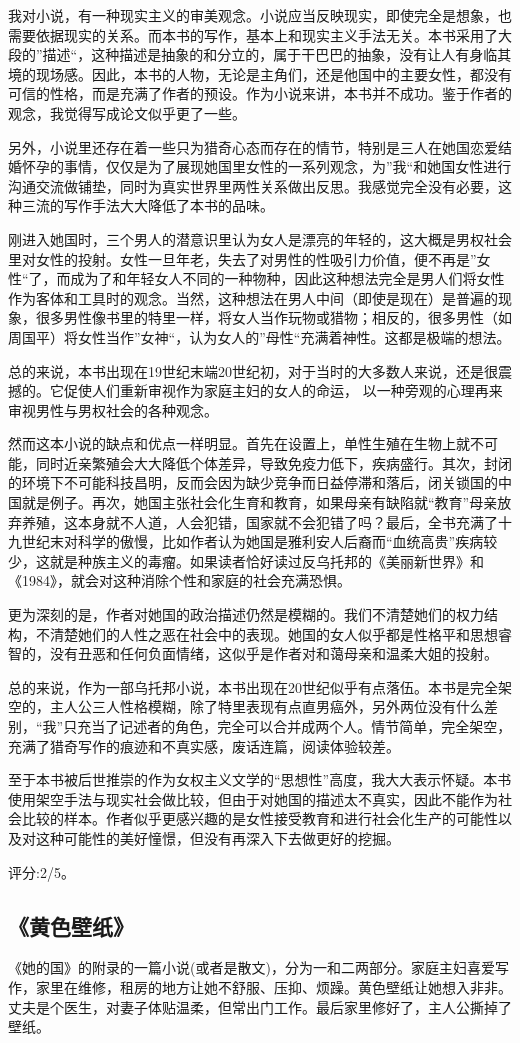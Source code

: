 我对小说，有一种现实主义的审美观念。小说应当反映现实，即使完全是想象，也需要依据现实的关系。而本书的写作，基本上和现实主义手法无关。本书采用了大段的”描述“，这种描述是抽象的和分立的，属于干巴巴的抽象，没有让人有身临其境的现场感。因此，本书的人物，无论是主角们，还是他国中的主要女性，都没有可信的性格，而是充满了作者的预设。作为小说来讲，本书并不成功。鉴于作者的观念，我觉得写成论文似乎更了一些。

另外，小说里还存在着一些只为猎奇心态而存在的情节，特别是三人在她国恋爱结婚怀孕的事情，仅仅是为了展现她国里女性的一系列观念，为”我“和她国女性进行沟通交流做铺垫，同时为真实世界里两性关系做出反思。我感觉完全没有必要，这种三流的写作手法大大降低了本书的品味。

刚进入她国时，三个男人的潜意识里认为女人是漂亮的年轻的，这大概是男权社会里对女性的投射。女性一旦年老，失去了对男性的性吸引力价值，便不再是”女性“了，而成为了和年轻女人不同的一种物种，因此这种想法完全是男人们将女性作为客体和工具时的观念。当然，这种想法在男人中间（即使是现在）是普遍的现象，很多男性像书里的特里一样，将女人当作玩物或猎物；相反的，很多男性（如周国平）将女性当作”女神“，认为女人的”母性“充满着神性。这都是极端的想法。

总的来说，本书出现在19世纪末端20世纪初，对于当时的大多数人来说，还是很震撼的。它促使人们重新审视作为家庭主妇的女人的命运， 以一种旁观的心理再来审视男性与男权社会的各种观念。

然而这本小说的缺点和优点一样明显。首先在设置上，单性生殖在生物上就不可能，同时近亲繁殖会大大降低个体差异，导致免疫力低下，疾病盛行。其次，封闭的环境下不可能科技昌明，反而会因为缺少竞争而日益停滞和落后，闭关锁国的中国就是例子。再次，她国主张社会化生育和教育，如果母亲有缺陷就“教育”母亲放弃养殖，这本身就不人道，人会犯错，国家就不会犯错了吗？最后，全书充满了十九世纪末对科学的傲慢，比如作者认为她国是雅利安人后裔而“血统高贵”疾病较少，这就是种族主义的毒瘤。如果读者恰好读过反乌托邦的《美丽新世界》和《1984》，就会对这种消除个性和家庭的社会充满恐惧。

更为深刻的是，作者对她国的政治描述仍然是模糊的。我们不清楚她们的权力结构，不清楚她们的人性之恶在社会中的表现。她国的女人似乎都是性格平和思想睿智的，没有丑恶和任何负面情绪，这似乎是作者对和蔼母亲和温柔大姐的投射。

总的来说，作为一部乌托邦小说，本书出现在20世纪似乎有点落伍。本书是完全架空的，主人公三人性格模糊，除了特里表现有点直男癌外，另外两位没有什么差别，“我”只充当了记述者的角色，完全可以合并成两个人。情节简单，完全架空，充满了猎奇写作的痕迹和不真实感，废话连篇，阅读体验较差。

至于本书被后世推崇的作为女权主义文学的“思想性”高度，我大大表示怀疑。本书使用架空手法与现实社会做比较，但由于对她国的描述太不真实，因此不能作为社会比较的样本。作者似乎更感兴趣的是女性接受教育和进行社会化生产的可能性以及对这种可能性的美好憧憬，但没有再深入下去做更好的挖掘。

评分:2/5。

\subsection{《黄色壁纸》}
《她的国》的附录的一篇小说(或者是散文)，分为一和二两部分。家庭主妇喜爱写作，家里在维修，租房的地方让她不舒服、压抑、烦躁。黄色壁纸让她想入非非。丈夫是个医生，对妻子体贴温柔，但常出门工作。最后家里修好了，主人公撕掉了壁纸。